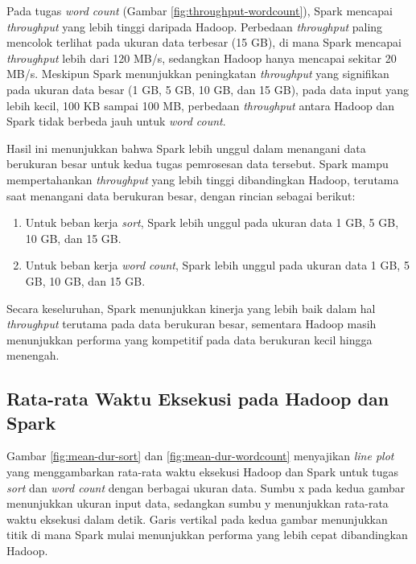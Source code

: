 Pada tugas \textit{word count} (Gambar \ref{fig:throughput-wordcount}), Spark mencapai \textit{throughput} yang lebih tinggi daripada Hadoop. Perbedaan \textit{throughput} paling mencolok terlihat pada ukuran data terbesar (15 GB), di mana Spark mencapai \textit{throughput} lebih dari 120 MB/s, sedangkan Hadoop hanya mencapai sekitar 20 MB/s. Meskipun Spark menunjukkan peningkatan \textit{throughput} yang signifikan pada ukuran data besar (1 GB, 5 GB, 10 GB, dan 15 GB), pada data input yang lebih kecil, 100 KB sampai 100 MB, perbedaan \textit{throughput} antara Hadoop dan Spark tidak berbeda jauh untuk \textit{word count}.

Hasil ini menunjukkan bahwa Spark lebih unggul dalam menangani data berukuran besar untuk kedua tugas pemrosesan data tersebut. Spark mampu mempertahankan \textit{throughput} yang lebih tinggi dibandingkan Hadoop, terutama saat menangani data berukuran besar, dengan rincian sebagai berikut:
\begin{enumerate}
\item Untuk beban kerja \textit{sort}, Spark lebih unggul pada ukuran data 1 GB, 5 GB, 10 GB, dan 15 GB.
\item Untuk beban kerja \textit{word count}, Spark lebih unggul pada ukuran data 1 GB, 5 GB, 10 GB, dan 15 GB.
\end{enumerate}

Secara keseluruhan, Spark menunjukkan kinerja yang lebih baik dalam hal \textit{throughput} terutama pada data berukuran besar, sementara Hadoop masih menunjukkan performa yang kompetitif pada data berukuran kecil hingga menengah.


\subsection {Rata-rata Waktu Eksekusi pada Hadoop dan Spark}

Gambar \ref{fig:mean-dur-sort} dan \ref{fig:mean-dur-wordcount} menyajikan \textit{line plot} yang menggambarkan rata-rata waktu eksekusi Hadoop dan Spark untuk tugas \textit{sort} dan \textit{word count} dengan berbagai ukuran data. Sumbu x pada kedua gambar menunjukkan ukuran input data, sedangkan sumbu y menunjukkan rata-rata waktu eksekusi dalam detik. Garis vertikal pada kedua gambar menunjukkan titik di mana Spark mulai menunjukkan performa yang lebih cepat dibandingkan Hadoop.


